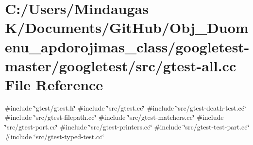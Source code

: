 \hypertarget{googletest-master_2googletest_2src_2gtest-all_8cc}{}\section{C\+:/\+Users/\+Mindaugas K/\+Documents/\+Git\+Hub/\+Obj\+\_\+\+Duomenu\+\_\+apdorojimas\+\_\+class/googletest-\/master/googletest/src/gtest-\/all.cc File Reference}
\label{googletest-master_2googletest_2src_2gtest-all_8cc}
{\ttfamily \#include \char`\"{}gtest/gtest.\+h\char`\"{}}\newline
{\ttfamily \#include \char`\"{}src/gtest.\+cc\char`\"{}}\newline
{\ttfamily \#include \char`\"{}src/gtest-\/death-\/test.\+cc\char`\"{}}\newline
{\ttfamily \#include \char`\"{}src/gtest-\/filepath.\+cc\char`\"{}}\newline
{\ttfamily \#include \char`\"{}src/gtest-\/matchers.\+cc\char`\"{}}\newline
{\ttfamily \#include \char`\"{}src/gtest-\/port.\+cc\char`\"{}}\newline
{\ttfamily \#include \char`\"{}src/gtest-\/printers.\+cc\char`\"{}}\newline
{\ttfamily \#include \char`\"{}src/gtest-\/test-\/part.\+cc\char`\"{}}\newline
{\ttfamily \#include \char`\"{}src/gtest-\/typed-\/test.\+cc\char`\"{}}\newline
